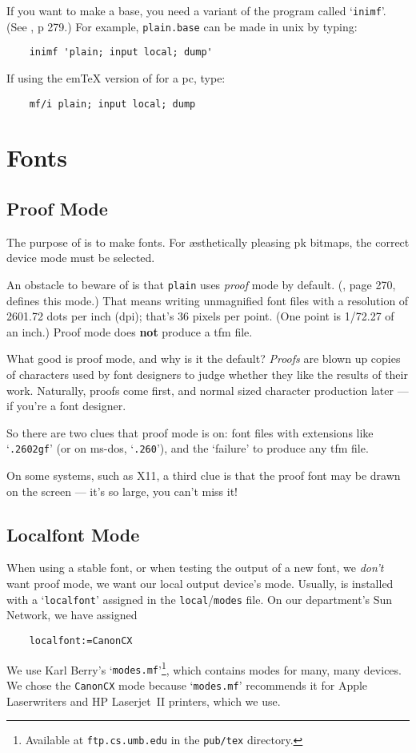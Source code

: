 If you want to make a base, you need a variant of the \MF{} program
called `{\tt inimf}'.  (See \MFbook{}, p 279.)  For example,
{\tt plain.base} can be made in {\sc unix} by typing:
\begin{verbatim}
    inimf 'plain; input local; dump'
\end{verbatim}
If using the em\TeX{} version of \MF{} for a {\sc pc}, type:
\begin{verbatim}
    mf/i plain; input local; dump
\end{verbatim}


\section{Fonts}\label{sec:fonts}


\subsection{Proof Mode}\label{sub:proof}

The purpose of \MF{} is to make fonts.  For \ae{}sthetically pleasing
{\sc pk} bitmaps, the correct device mode must be selected.

An obstacle to beware of is that {\tt plain} \MF{} uses
{\em proof\/} mode by default.
(\MFbook{}, page 270, defines this mode.)
That means writing unmagnified font files with a resolution of
2601.72 dots per inch (dpi); that's 36 pixels per point.  (One
point is 1/72.27 of an inch.)  Proof mode does {\bf not} produce a
{\sc tfm} file.

What good is proof mode, and why is it the default?
{\em Proofs\/} are blown up copies of characters used by font
designers to judge whether they like the results of their work.
Naturally, proofs come first, and normal sized character production
later --- if you're a font designer.

So there are two clues that proof mode is on:  font files with
extensions like `{\tt .2602gf}' (or on {\sc ms-dos}, `{\tt .260}'),
and the `failure' to produce any {\sc tfm} file.

On some systems, such as {\sc X11}, a third clue is that the proof
font may be drawn on the screen --- it's so large, you can't miss it!


\subsection{Localfont Mode}\label{sub:localfont}

When using a stable font, or when testing the output of a new font,
we {\em don't\/} want proof mode,
we want our local output device's mode.
Usually, \MF{} is installed with a `{\tt localfont}'
assigned in the {\tt local}/{\tt modes} file.
On our department's Sun Network, we have assigned
\begin{verbatim}
    localfont:=CanonCX
\end{verbatim}
We use Karl {\sc Berry\/}'s `{\tt modes.mf}'\footnote
{Available at {\tt ftp.cs.umb.edu} in the {\tt pub/tex} directory.},
which contains modes for many, many devices.  We chose the
{\tt CanonCX} mode because `{\tt modes.mf}' recommends it for Apple
Laserwriters and HP Laserjet~II printers, which we use.

